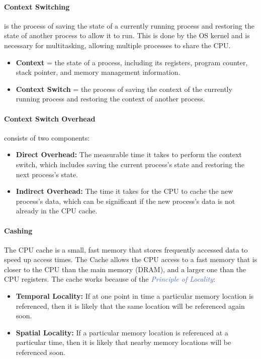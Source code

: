 \documentclass[openany,12pt]{book}
\newcommand{\blue}[1]{\textcolor{RoyalBlue}{#1}}
\begin{document}
\paragraph{Context Switching} is the process of saving the state of a currently running process and restoring the state of another process to allow it to run. This is done by the OS kernel and is necessary for multitasking, allowing multiple processes to share the CPU.
\begin{itemize}
  \item \textbf{Context} = the state of a process, including its registers, program counter, stack pointer, and memory management information.
  \item \textbf{Context Switch} = the process of saving the context of the currently running process and restoring the context of another process.
\end{itemize}

\paragraph{Context Switch Overhead} consists of two components:
\begin{itemize}
  \item \textbf{Direct Overhead:} The measurable time it takes to perform the context switch, which includes saving the current process's state and restoring the next process's state.
  \item \textbf{Indirect Overhead:} The time it takes for the CPU to cache the new process's data, which can be significant if the new process's data is not already in the CPU cache.
\end{itemize}

\paragraph{Cashing} The CPU cache is a small, fast memory that stores frequently accessed data to speed up access times. The Cache allows the CPU access to a fast memory that is closer to the CPU than the main memory (DRAM), and a larger one than the CPU registers. The cache works because of the \blue{\textit{Principle of Locality}}:
\begin{itemize}
  \item \textbf{Temporal Locality:} If at one point in time a particular memory location is referenced, then it is likely that the same location will be referenced again soon.
  \item \textbf{Spatial Locality:} If a particular memory location is referenced at a particular time, then it is likely that nearby memory locations will be referenced soon.
\end{itemize}
\end{document}
